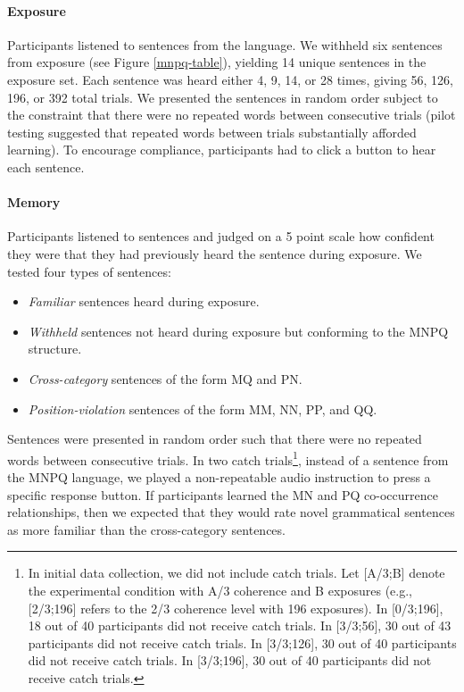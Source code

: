 \documentclass[man,floatsintext]{apa6}
\begin{document}
\paragraph{Exposure}
Participants listened to sentences from the language. We withheld six sentences from exposure (see Figure \ref{mnpq-table}), yielding 14 unique sentences in the exposure set. Each sentence was heard either 4, 9, 14, or 28 times, giving 56, 126, 196, or 392 total trials. We presented the sentences in random order subject to the constraint that there were no repeated words between consecutive trials (pilot testing suggested that repeated words between trials substantially afforded learning). To encourage compliance, participants had to click a button to hear each sentence.

\paragraph{Memory}
Participants listened to sentences and judged on a 5 point scale how confident they were that they had previously heard the sentence during exposure. We tested four types of sentences:

\begin{itemize}
\item \emph{Familiar} sentences heard during exposure.
\item \emph{Withheld} sentences not heard during exposure but
conforming to the MNPQ structure.
\item \emph{Cross-category} sentences of the form MQ and PN.
\item \emph{Position-violation} sentences of the form MM, NN, PP, and
QQ.
\end{itemize}

Sentences were presented in random order such that there were no repeated words between consecutive trials. In two catch trials\footnote{In initial data collection, we did not include catch trials.  Let [A/3;B] denote the experimental condition with A/3 coherence and B exposures (e.g., [2/3;196] refers to the 2/3 coherence level with 196 exposures). In [0/3;196], 18 out of 40 participants did not receive catch trials. In [3/3;56], 30 out of 43 participants did not receive catch trials. In [3/3;126], 30 out of 40 participants did not receive catch trials. In [3/3;196], 30 out of 40 participants did not receive catch trials.}, instead of a sentence from the MNPQ language, we played a non-repeatable audio instruction to press a specific response button.  If participants learned the MN and PQ co-occurrence relationships, then we expected that they would rate novel grammatical sentences as more familiar than the cross-category sentences.
\end{document}
